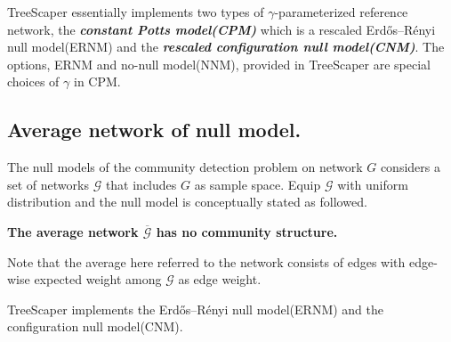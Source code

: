 \documentclass[11pt]{article}
\theoremstyle{definition}
\theoremstyle{definition}
\theoremstyle{definition}
\theoremstyle{remark}
\theoremstyle{plain}
\begin{document}
TreeScaper essentially implements two types of $\gamma$-parameterized reference network, the \emph{\textbf{constant Potts model(CPM)}} which is a rescaled Erdős–Rényi null model(ERNM) and the \emph{\textbf{rescaled configuration null model(CNM)}}. The options, ERNM and no-null model(NNM), provided in TreeScaper are special choices of $\gamma$ in CPM.





\subsection{Average network of null model.}

The null models of the community detection problem on network $G$ considers a set of networks $\mathcal{G}$ that includes $G$ as sample space. Equip $\mathcal{G}$ with uniform distribution and the null model is conceptually stated as followed.

\noindent\textbf{The average network $\overline{\mathcal{G}}$ has no community structure.}

Note that the average here referred to the network consists of edges with edge-wise expected weight among $\mathcal{G}$ as edge weight.

TreeScaper implements the Erdős–Rényi null model(ERNM) and the configuration null model(CNM).
\end{document}
